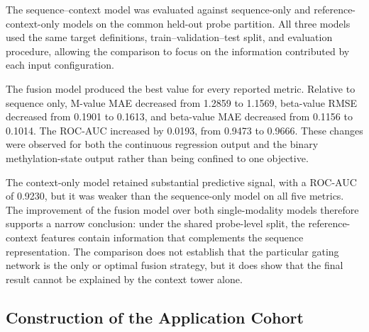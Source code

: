 \documentclass[10pt,letterpaper,twocolumn]{article}
\begin{document}
The sequence--context model was evaluated against sequence-only and
reference-context-only models on the common held-out probe partition.
All three models used the same target definitions, train--validation--test
split, and evaluation procedure, allowing the comparison to focus on the
information contributed by each input configuration.

\begin{table}[H]
\centering
\caption{\textbf{Held-out predictive performance.} Lower RMSE and MAE
and higher ROC-AUC indicate better performance.}
\label{tab:performance}
\small
{}
\end{table}

The fusion model produced the best value for every reported metric.
Relative to sequence only, M-value MAE decreased from 1.2859 to 1.1569,
beta-value RMSE decreased from 0.1901 to 0.1613, and beta-value MAE
decreased from 0.1156 to 0.1014. The ROC-AUC increased by 0.0193, from
0.9473 to 0.9666. These changes were observed for both the continuous
regression output and the binary methylation-state output rather than
being confined to one objective.

The context-only model retained substantial predictive signal, with a
ROC-AUC of 0.9230, but it was weaker than the sequence-only model on all
five metrics. The improvement of the fusion model over both
single-modality models therefore supports a narrow conclusion: under the
shared probe-level split, the reference-context features contain
information that complements the sequence representation. The
comparison does not establish that the particular gating network is the
only or optimal fusion strategy, but it does show that the final result
cannot be explained by the context tower alone.

\subsection{Construction of the Application Cohort}
\end{document}
